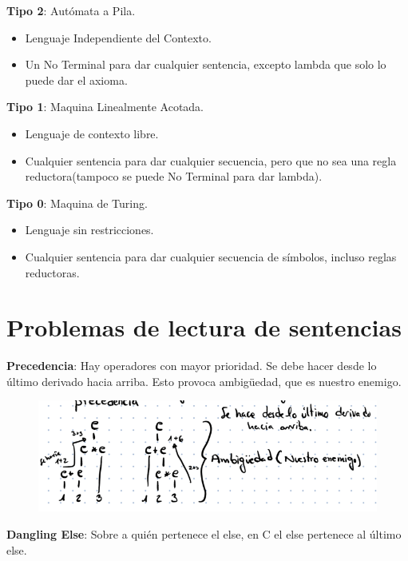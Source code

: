 \documentclass[12pt]{report} %
\begin{document}
\textbf{Tipo 2}: Autómata a Pila.

\begin{itemize}
\item
  Lenguaje Independiente del Contexto.
\item
  Un No Terminal para dar cualquier sentencia, excepto lambda que solo
  lo puede dar el axioma.
\end{itemize}

\textbf{Tipo 1}: Maquina Linealmente Acotada.

\begin{itemize}
\item
  Lenguaje de contexto libre.
\item
  Cualquier sentencia para dar cualquier secuencia, pero que no sea una
  regla reductora(tampoco se puede No Terminal para dar lambda).
\end{itemize}

\textbf{Tipo 0}: Maquina de Turing.

\begin{itemize}
\item
  Lenguaje sin restricciones.
\item
  Cualquier sentencia para dar cualquier secuencia de símbolos, incluso
  reglas reductoras.
\end{itemize}

\section{Problemas de lectura de sentencias}

\textbf{Precedencia}: Hay operadores con mayor prioridad. Se debe hacer
desde lo último derivado hacia arriba. Esto provoca ambigüedad, que es
nuestro enemigo.

\begin{figure}[H]
	{\includegraphics[scale=.4]{Untitled.png}}
\end{figure}

\textbf{Dangling Else}: Sobre a quién pertenece el else, en C el else
pertenece al último else.
\end{document}
